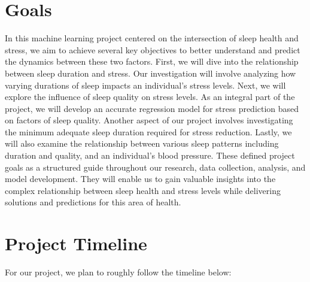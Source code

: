 \documentclass[11pt, letterpaper]{article}
\begin{document}
    \section*{Goals}
    In this machine learning project centered on the intersection of sleep health and stress, we aim to achieve several key objectives to better understand and predict the dynamics 
    between these two factors. First, we will dive into the relationship between sleep duration and stress. Our investigation will involve analyzing how varying durations of sleep 
    impacts an individual's stress levels. Next, we will explore the influence of sleep quality on stress levels. As an integral part of the project, we will develop an accurate 
    regression model for stress prediction based on factors of sleep quality. Another aspect of our project involves investigating the minimum adequate sleep duration required 
    for stress reduction. Lastly, we will also examine the relationship between various sleep patterns including duration and quality, and an individual's blood pressure. These 
    defined project goals as a structured guide throughout our research, data collection, analysis, and model development. They will enable us to gain valuable insights into the 
    complex relationship between sleep health and stress levels while delivering solutions and predictions for this area of health.

    \newpage

    \section*{Project Timeline}
    For our project, we plan to roughly follow the timeline below:
\end{document}

